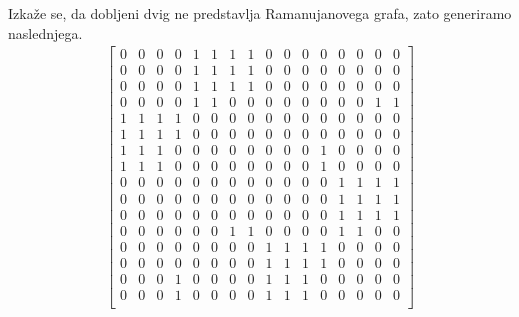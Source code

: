\begin{primer}
    Izkaže se, da dobljeni dvig ne predstavlja Ramanujanovega grafa, zato generiramo naslednjega.
    \begin{align*}
        \begin{bmatrix}
            0 & 0 & 0 & 0 & 1 & 1 & 1 & 1 & 0 & 0 & 0 & 0 & 0 & 0 & 0 & 0\\
            0 & 0 & 0 & 0 & 1 & 1 & 1 & 1 & 0 & 0 & 0 & 0 & 0 & 0 & 0 & 0\\
            0 & 0 & 0 & 0 & 1 & 1 & 1 & 1 & 0 & 0 & 0 & 0 & 0 & 0 & 0 & 0\\
            0 & 0 & 0 & 0 & 1 & 1 & 0 & 0 & 0 & 0 & 0 & 0 & 0 & 0 & 1 & 1\\
            1 & 1 & 1 & 1 & 0 & 0 & 0 & 0 & 0 & 0 & 0 & 0 & 0 & 0 & 0 & 0\\
            1 & 1 & 1 & 1 & 0 & 0 & 0 & 0 & 0 & 0 & 0 & 0 & 0 & 0 & 0 & 0\\
            1 & 1 & 1 & 0 & 0 & 0 & 0 & 0 & 0 & 0 & 0 & 1 & 0 & 0 & 0 & 0\\
            1 & 1 & 1 & 0 & 0 & 0 & 0 & 0 & 0 & 0 & 0 & 1 & 0 & 0 & 0 & 0\\
            0 & 0 & 0 & 0 & 0 & 0 & 0 & 0 & 0 & 0 & 0 & 0 & 1 & 1 & 1 & 1\\
            0 & 0 & 0 & 0 & 0 & 0 & 0 & 0 & 0 & 0 & 0 & 0 & 1 & 1 & 1 & 1\\
            0 & 0 & 0 & 0 & 0 & 0 & 0 & 0 & 0 & 0 & 0 & 0 & 1 & 1 & 1 & 1\\
            0 & 0 & 0 & 0 & 0 & 0 & 1 & 1 & 0 & 0 & 0 & 0 & 1 & 1 & 0 & 0\\
            0 & 0 & 0 & 0 & 0 & 0 & 0 & 0 & 1 & 1 & 1 & 1 & 0 & 0 & 0 & 0\\
            0 & 0 & 0 & 0 & 0 & 0 & 0 & 0 & 1 & 1 & 1 & 1 & 0 & 0 & 0 & 0\\
            0 & 0 & 0 & 1 & 0 & 0 & 0 & 0 & 1 & 1 & 1 & 0 & 0 & 0 & 0 & 0\\
            0 & 0 & 0 & 1 & 0 & 0 & 0 & 0 & 1 & 1 & 1 & 0 & 0 & 0 & 0 & 0\\
    \end{bmatrix}
    \end{align*}
    \begin{figure}[H]
        \centering
\end{figure}
\end{primer}
